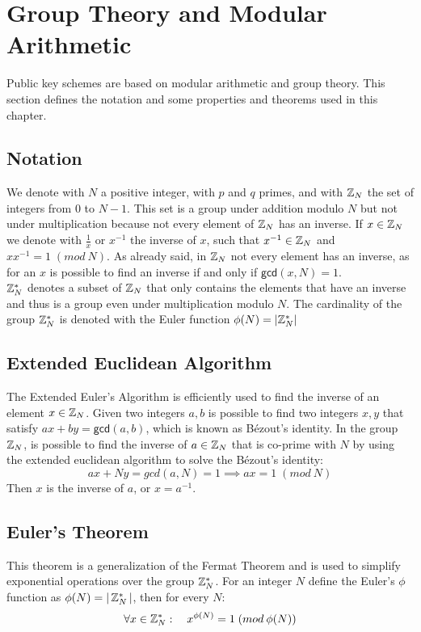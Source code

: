 \section{Group Theory and Modular Arithmetic}
Public key schemes are based on modular arithmetic and group theory. This section defines the notation and some properties and theorems used in this chapter.
\subsection{Notation}
We denote with $N$ a positive integer, with $p$ and $q$ primes, and with $\mathbb{Z}_N$ the set of integers from $0$ to $N-1$. This set is a group under addition modulo $N$ but not under multiplication because not every element of $\mathbb{Z}_N$ has an inverse. If $x \in \mathbb{Z}_N$ we denote with $\frac{1}{x}$ or $x^{-1}$ the inverse of $x$, such that $x^{-1} \in \mathbb{Z}_N$ and $xx^{-1} = 1 \; (mod \: N)$. As already said, in $\mathbb{Z}_N$ not every element has an inverse, as for an $x$ is possible to find an inverse if and only if $\mathsf{gcd}(x,N) = 1$.\\
$\mathbb{Z}_N^{*}$ denotes a subset of $\mathbb{Z}_N$ that only contains the elements that have an inverse and thus is a group even under multiplication modulo $N$. The cardinality of the group $\mathbb{Z}_N^{*}$ is denoted with the Euler function $\phi(N) = |\mathbb{Z}_N^{*}|$
\subsection{Extended Euclidean Algorithm}
The Extended Euler's Algorithm is efficiently used to find the inverse of an element $x \in \mathbb{Z}_N$. Given two integers $a, b$ is possible to find two integers $x, y$ that satisfy $ax + by = \mathsf{gcd}(a, b)$, which is known as Bézout's identity.
In the group $\mathbb{Z}_N$, is possible to find the inverse of $a \in \mathbb{Z}_N$ that is co-prime with $N$ by using the extended euclidean algorithm to solve the Bézout's identity:
$$
   ax+Ny = gcd(a, N) = 1 \implies ax = 1 \; (mod \: N)
$$
Then $x$ is the inverse of $a$, or $x = a^{-1}$.
\subsection{Euler's Theorem}
This theorem is a generalization of the Fermat Theorem and is used to simplify exponential operations over the group $\mathbb{Z}_N^{*}$. For an integer $N$ define the Euler's $\phi$ function as $\phi(N) = | \, \mathbb{Z}_N^{*} \, |$, then for every $N$:
$$\forall x \in \mathbb{Z}_N^{*}: \quad x^{\phi(N)} = 1 \; (mod \: \phi(N))$$
